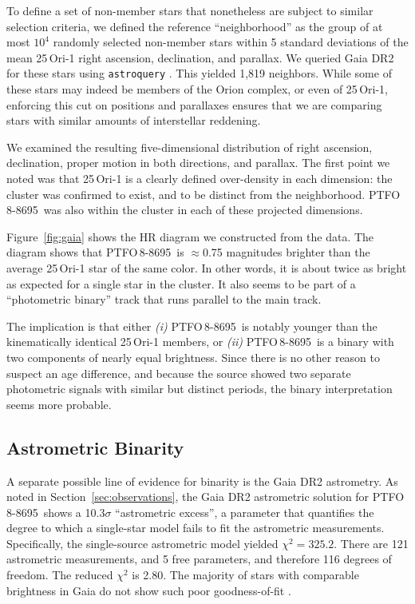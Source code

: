 \documentclass[12pt,twocolumn,tighten]{aastex62}
\newcommand{\ptfo}{PTFO$\,$8-8695}
\begin{document}
To define a set of non-member stars that nonetheless are subject
to similar selection criteria,
we defined the reference ``neighborhood'' as the
group of at most $10^4$ randomly selected non-member stars within 5
standard deviations of the mean 25$\,$Ori-1 right ascension,
declination, and parallax.  We queried Gaia DR2 for these stars using
\texttt{astroquery} \citep{astroquery_2018}.  This yielded 1{,}819
neighbors.  While some of these stars may indeed be members of the
Orion complex, or even of 25$\,$Ori-1, enforcing this cut on positions
and parallaxes ensures that we are comparing stars with similar
amounts of interstellar reddening.

We examined the resulting five-dimensional distribution of right ascension,
declination, proper motion in both directions, and parallax.  The first point we noted
was that 25$\,$Ori-1 is a clearly defined over-density in each
dimension: the cluster was confirmed to exist, and to be distinct from the neighborhood. \ptfo\ was also within the cluster in each of these projected
dimensions.

Figure~\ref{fig:gaia} shows
the HR diagram we constructed from the data.  The diagram shows
that \ptfo\ is $\approx$0.75 magnitudes brighter than the average
25$\,$Ori-1 star of the same color.  In other words, it is about twice
as bright as expected for a single star in the cluster.
It also seems to be part of a ``photometric binary''
track that runs parallel to the main track.

The implication is that either {\it (i)} \ptfo\ is notably younger
than the kinematically identical 25$\,$Ori-1 members, or {\it (ii)}
\ptfo\ is a binary with two components of nearly equal brightness.
Since there is no other reason to
suspect an age difference, and because the source showed two separate
photometric signals with similar but distinct periods,
the binary interpretation seems more probable.

\subsection{Astrometric Binarity}

A separate possible line of evidence for binarity is the Gaia DR2
astrometry.  As noted in Section~\ref{sec:observations}, the Gaia DR2
astrometric solution for \ptfo\ shows a 10.3$\sigma$ ``astrometric excess'',
a parameter that quantifies the degree to which a single-star model
fails to fit the astrometric measurements.  Specifically,
the single-source astrometric model yielded $\chi^2=325.2$.  There are
121 astrometric measurements, and 5 free parameters, and therefore 116
degrees of freedom. The reduced $\chi^2$ is 2.80.  The majority of
stars with comparable brightness in Gaia do not show such poor
goodness-of-fit \citep[see][Appendix A]{lindegren_gaiasoln_2018}.
\end{document}
